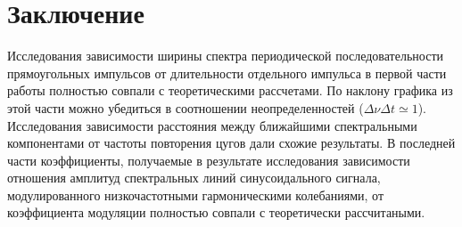 \documentclass[a4paper,11pt]{extarticle}
\begin{document}
\section*{Заключение}
Исследования зависимости ширины спектра периодической последовательности прямоугольных импульсов от длительности отдельного импульса в первой части работы полностью совпали с теоретическими рассчетами. По наклону графика из этой части можно убедиться в соотношении неопределенностей ($\Delta \nu \Delta t \simeq 1$).
\n\n
Исследования зависимости расстояния между ближайшими спектральными компонентами от частоты повторения цугов дали схожие результаты.
\n\n
В последней части коэффициенты, получаемые в результате исследования зависимости отношения амплитуд спектральных линий синусоидального сигнала, модулированного низкочастотными гармоническими колебаниями, от коэффициента модуляции полностью совпали с теоретически рассчитаными.



\end{document}
